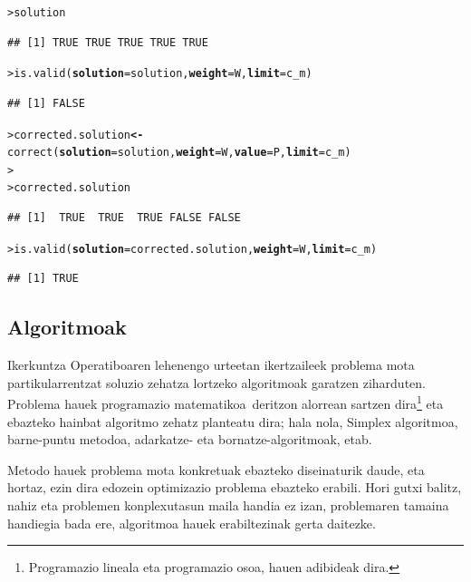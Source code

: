 \documentclass[eu]{ifirak}\usepackage[]{graphicx}\usepackage[]{color}
\makeatletter
\newcommand{\hlstd}[1]{\textcolor[rgb]{0,0,0}{#1}}%
\newcommand{\hlkwb}[1]{\textcolor[rgb]{0.549,0.114,0.412}{\textbf{#1}}}%
\newcommand{\hlkwc}[1]{\textcolor[rgb]{0.659,0.573,0.133}{\textbf{#1}}}%
\newcommand{\hlkwd}[1]{\textcolor[rgb]{0.659,0.133,0.482}{#1}}%
\newenvironment{kframe}{%
 \def\at@end@of@kframe{}%
 \ifinner\ifhmode%
  \def\at@end@of@kframe{\end{minipage}}%
  \begin{minipage}{\columnwidth}%
 \fi\fi%
 \def\FrameCommand##1{\hskip\@totalleftmargin \hskip-\fboxsep
 \colorbox{shadecolor}{##1}\hskip-\fboxsep
     \hskip-\linewidth \hskip-\@totalleftmargin \hskip\columnwidth}%
 \MakeFramed {\advance\hsize-\width
   \@totalleftmargin\z@ \linewidth\hsize
   \@setminipage}}%
 {\par\unskip\endMakeFramed%
 \at@end@of@kframe}
\newenvironment{knitrout}{}{} %
\newcommand{\zkk}{\guillemotleft}
\newcommand{\skk}{\guillemotright}
\makeatother
\begin{document}
\begin{knitrout}
\color{fgcolor}\begin{kframe}
\begin{alltt}
\hlstd{> }\hlstd{solution}
\end{alltt}
\begin{verbatim}
## [1] TRUE TRUE TRUE TRUE TRUE
\end{verbatim}
\begin{alltt}
\hlstd{> }\hlkwd{is.valid}\hlstd{(}\hlkwc{solution} \hlstd{= solution ,} \hlkwc{weight} \hlstd{= W ,} \hlkwc{limit} \hlstd{= c_m)}
\end{alltt}
\begin{verbatim}
## [1] FALSE
\end{verbatim}
\begin{alltt}
\hlstd{> }\hlstd{corrected.solution} \hlkwb{<-} \hlkwd{correct} \hlstd{(}\hlkwc{solution} \hlstd{= solution ,} \hlkwc{weight} \hlstd{= W ,} \hlkwc{value} \hlstd{= P ,} \hlkwc{limit} \hlstd{= c_m)}
\hlstd{> }
\hlstd{> }\hlstd{corrected.solution}
\end{alltt}
\begin{verbatim}
## [1]  TRUE  TRUE  TRUE FALSE FALSE
\end{verbatim}
\begin{alltt}
\hlstd{> }\hlkwd{is.valid}\hlstd{(}\hlkwc{solution} \hlstd{= corrected.solution ,} \hlkwc{weight} \hlstd{= W ,} \hlkwc{limit} \hlstd{= c_m)}
\end{alltt}
\begin{verbatim}
## [1] TRUE
\end{verbatim}
\end{kframe}
\end{knitrout}


\subsection{Algoritmoak}

Ikerkuntza Operatiboaren lehenengo urteetan ikertzaileek problema mota partikularrentzat soluzio zehatza lortzeko algoritmoak garatzen ziharduten. Problema hauek \zkk programazio matematikoa\skk\ deritzon alorrean sartzen dira\footnote {Programazio lineala eta programazio osoa, hauen adibideak dira.} eta ebazteko hainbat algoritmo zehatz planteatu dira; hala nola, Simplex algoritmoa, barne-puntu metodoa, adarkatze- eta bornatze-algoritmoak, etab. 

Metodo hauek problema mota konkretuak ebazteko diseinaturik daude, eta hortaz, ezin dira edozein optimizazio problema ebazteko erabili. Hori gutxi balitz, nahiz eta problemen konplexutasun maila handia ez izan, problemaren tamaina handiegia bada ere, algoritmoa hauek erabiltezinak gerta daitezke. 
\end{document}
